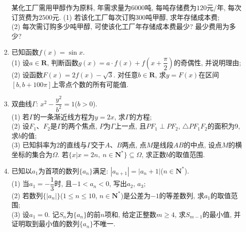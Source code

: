 \documentclass[10pt,a4paper]{article}
\begin{document}
\begin{enumerate}[1.]
某化工厂需用甲醇作为原料, 年需求量为$6000$吨, 每吨存储费为$120$元/年, 每次订货费为$2500$元.
(1) 若该化工厂每次订购$300$吨甲醇, 求年存储成本费;\\
(2) 每次需订购多少吨甲醇, 可使该化工厂年存储成本费最少? 最少费用为多少?
\item 已知函数$f(x)=\sin x$.\\
(1) 设$a\in \mathbf{R}$, 判断函数$g(x)=a\cdot f(x)+f(x+\dfrac{\pi}2)$的奇偶性, 并说明理由;\\
(2) 设函数$F(x)=2f(x)-\sqrt 3$. 对任意$b\in \mathbf{R}$, 求$y=F(x)$在区间$[b,b+100\pi]$上零点个数的所有可能值.
\item 双曲线$\Gamma$: $x^2-\dfrac{y^2}{b^2}=1$($b>0$).\\
(1) 若$\Gamma$的一条渐近线方程为$y=2x$, 求$\Gamma$的方程;\\
(2) 设$F_1$、$F_2$是$\Gamma$的两个焦点, $P$为$\Gamma$上一点, 且$PF_1\perp PF_2$, $\triangle PF_1F_2$的面积为$9$, 求$b$的值;\\
(3) 已知斜率为$2$的直线与$\Gamma$交于$A$、$B$两点, 点$M$是线段$AB$的中点, 设点$M$的横坐标的集合为$\Omega$. 若$\{x|x=2n,\ n\in \mathbf{N}^* \}\subseteq \Omega$, 求正数$b$的取值范围.
\item 已知以$a_1$为首项的数列$\{a_n\}$满足: $|a_{n+1}|=|a_n+1|$($n\in \mathbf{N}^*$).\\
(1) 当$a_1=-\dfrac 13$时, 且$-1<a_n<0$, 写出$a_2$, $a_3$;\\
(2) 若数列$\{|a_n|\}$($1\le n\le 10$, $n\in \mathbf{N}^*$)是公差为$-1$的等差数列, 求$a_1$的取值范围;\\
(3) 设$a_1=0$. 记$S_n$为$\{a_n\}$的前$n$项和, 给定正整数$m\ge 4$, 求$S_{m-1}$的最小值, 并证明取到最小值的数列$\{a_n\}$不唯一.



\end{enumerate}
\end{document}
